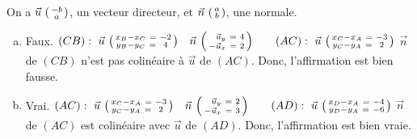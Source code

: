 \documentclass[12pt, a4paper]{article}
\begin{document}
	\begin{Exercise}[number={53}]
		On a $\vec{u}\ \begin{psmallmatrix}-b \\ a\end{psmallmatrix}$, un vecteur directeur, et $\vec{n}\ \begin{psmallmatrix}a \\ b\end{psmallmatrix}$, une normale.
	   \begin{enumerate}[a)]
			\item	Faux. $(CB):\ \vec{u}\ \begin{psmallmatrix}x_B-x_C\ =& -2 \\ y_B-y_C\ =& 4\end{psmallmatrix} \quad \vec{n}\ \begin{psmallmatrix}\hphantom{-}\vec{u}_y\ =& 4 \\ -\vec{u}_x\ =& 2\end{psmallmatrix} \qquad (AC):\ \vec{u}\ \begin{psmallmatrix}x_C-x_A\ =& -3 \\ y_C-y_A\ =& 2\end{psmallmatrix}$ \smallbreak $\vec{n}$ de $(CB)$ n'est pas colinéaire à $\vec{u}$ de $(AC)$. Donc, l'affirmation est bien fausse.
			\item	Vrai. $(AC):\ \vec{u}\ \begin{psmallmatrix}x_C-x_A\ =& -3 \\ y_C-y_A\ =& 2\end{psmallmatrix} \quad \vec{n}\ \begin{psmallmatrix}\hphantom{-}\vec{u}_y\ =& 2 \\ -\vec{u}_x\ =& 3\end{psmallmatrix} \qquad (AD):\ \vec{u}\ \begin{psmallmatrix}x_D-x_A\ =& -4 \\ y_D-y_A\ =& -6\end{psmallmatrix}$ \smallbreak $\vec{n}$ de $(AC)$ est colinéaire avec $\vec{u}$ de $(AD)$. Donc, l'affirmation est bien vraie.
	   \end{enumerate}
	\end{Exercise}
\end{document}
